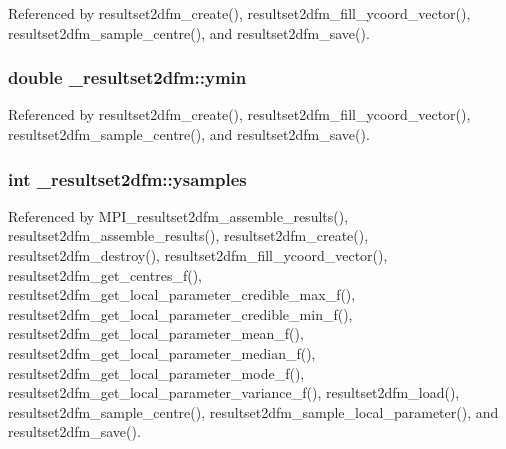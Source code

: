 Referenced by resultset2dfm\+\_\+create(), resultset2dfm\+\_\+fill\+\_\+ycoord\+\_\+vector(), resultset2dfm\+\_\+sample\+\_\+centre(), and resultset2dfm\+\_\+save().

\subsubsection[{\texorpdfstring{ymin}{ymin}}]{\setlength{\rightskip}{0pt plus 5cm}double \+\_\+resultset2dfm\+::ymin}\hypertarget{struct__resultset2dfm_a7aa08ca18205eeba24fe752351436b93}{}\label{struct__resultset2dfm_a7aa08ca18205eeba24fe752351436b93}


Referenced by resultset2dfm\+\_\+create(), resultset2dfm\+\_\+fill\+\_\+ycoord\+\_\+vector(), resultset2dfm\+\_\+sample\+\_\+centre(), and resultset2dfm\+\_\+save().

\subsubsection[{\texorpdfstring{ysamples}{ysamples}}]{\setlength{\rightskip}{0pt plus 5cm}int \+\_\+resultset2dfm\+::ysamples}\hypertarget{struct__resultset2dfm_ab22b1f3b87ab2bd5063bda721d7514dc}{}\label{struct__resultset2dfm_ab22b1f3b87ab2bd5063bda721d7514dc}


Referenced by M\+P\+I\+\_\+resultset2dfm\+\_\+assemble\+\_\+results(), resultset2dfm\+\_\+assemble\+\_\+results(), resultset2dfm\+\_\+create(), resultset2dfm\+\_\+destroy(), resultset2dfm\+\_\+fill\+\_\+ycoord\+\_\+vector(), resultset2dfm\+\_\+get\+\_\+centres\+\_\+f(), resultset2dfm\+\_\+get\+\_\+local\+\_\+parameter\+\_\+credible\+\_\+max\+\_\+f(), resultset2dfm\+\_\+get\+\_\+local\+\_\+parameter\+\_\+credible\+\_\+min\+\_\+f(), resultset2dfm\+\_\+get\+\_\+local\+\_\+parameter\+\_\+mean\+\_\+f(), resultset2dfm\+\_\+get\+\_\+local\+\_\+parameter\+\_\+median\+\_\+f(), resultset2dfm\+\_\+get\+\_\+local\+\_\+parameter\+\_\+mode\+\_\+f(), resultset2dfm\+\_\+get\+\_\+local\+\_\+parameter\+\_\+variance\+\_\+f(), resultset2dfm\+\_\+load(), resultset2dfm\+\_\+sample\+\_\+centre(), resultset2dfm\+\_\+sample\+\_\+local\+\_\+parameter(), and resultset2dfm\+\_\+save().

